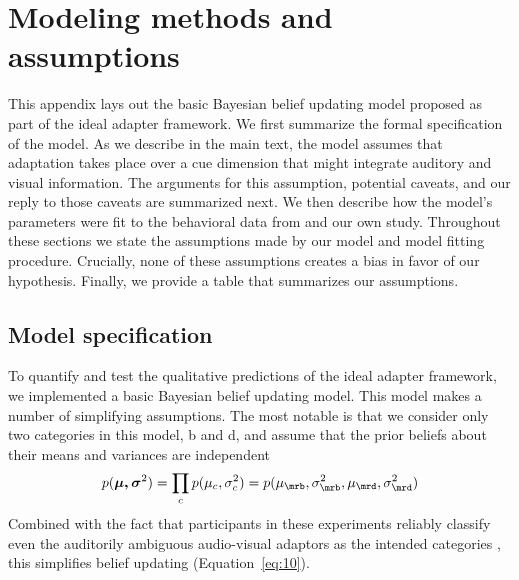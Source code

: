 
\section{Modeling methods and assumptions}
\label{sec:appendix}

This appendix lays out the basic Bayesian belief updating model proposed as part of the ideal adapter framework. %
We first summarize the formal specification of the model. As we describe in the main text, the model assumes that adaptation takes place over a cue dimension that might integrate auditory and visual information. The arguments for this assumption, potential caveats, and our reply to those caveats are summarized
next. We then %
describe how the model's parameters were fit to the behavioral data from \textcite{Vroomen2007} and our own study. Throughout these sections we state the assumptions made by our model and model fitting procedure. Crucially, none of these assumptions creates a bias in favor of our hypothesis. Finally, we provide a table that summarizes our assumptions.

\subsection{Model specification}
\label{sec:model-fitting-methods}

To quantify and test the qualitative predictions of the ideal adapter framework, we implemented a basic Bayesian belief updating model.  This model makes a number of simplifying assumptions. The most notable is that we consider only two categories in this model, \ph b and \ph d, and assume that the prior beliefs about their means and variances are independent
\begin{equation}
  \label{eq:21}
  p(\boldsymbol{\mu, \sigma}^2) = \prod_c p(\mu_c, \sigma^2_c) = p(\mu_\mrb, \sigma^2_\mrb, \mu_\mrd, \sigma^2_\mrd)
\end{equation}
Combined with the fact that participants in these experiments reliably classify even the auditorily ambiguous audio-visual adaptors as the intended categories \autocite{Vroomen2004}, this simplifies belief updating (Equation~\ref{eq:10}).

